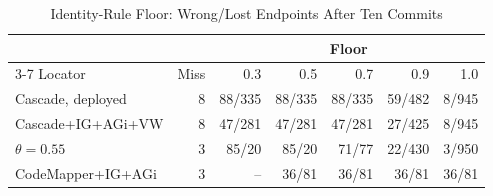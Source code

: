\begin{table}[t]
\caption{Identity-Rule Floor: Wrong/Lost Endpoints After Ten Commits}\label{tab:idfloor}
\centering\footnotesize
\setlength{\tabcolsep}{2.5pt}
\begin{tabular}{@{}lrrrrrr@{}}\toprule
 & & \multicolumn{5}{c}{Floor} \\ \cmidrule(l){3-7}
Locator & Miss & 0.3 & 0.5 & 0.7 & 0.9 & 1.0 \\ \midrule
Cascade, deployed & 8 & 88/335 & 88/335 & 88/335 & 59/482 & 8/945 \\
Cascade+IG+AGi+VW & 8 & 47/281 & 47/281 & 47/281 & 27/425 & 8/945 \\
\quad $\theta{=}0.55$ & 3 & 85/20 & 85/20 & 71/77 & 22/430 & 3/950 \\
CodeMapper+IG+AGi & 3 & -- & 36/81 & 36/81 & 36/81 & 36/81 \\
\bottomrule
\end{tabular}
\end{table}
